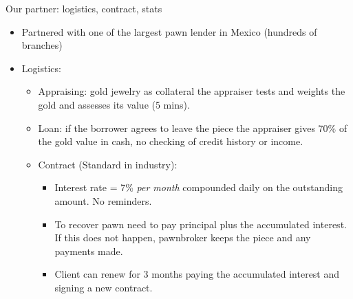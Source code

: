 \documentclass[8pt]{beamer}
\begin{document}
\begin{frame}{Our partner: logistics, contract, stats}
    \begin{itemize}
        \item Partnered with one of the largest pawn lender in Mexico (hundreds of branches)
        \vfill\item Logistics: 
        \begin{itemize}
            \vfill\item Appraising:  gold jewelry as collateral the appraiser tests and weights the gold and assesses its value (5 mins).
           \vfill \item Loan: if the borrower agrees to leave the piece the appraiser gives 70\% of the gold value in cash, no checking of credit history or income.
           \vfill \item Contract (Standard in industry): 
           \begin{itemize}
               \vfill\item Interest rate = 7\% \textit{per month} compounded daily on the outstanding amount. No reminders.
               \vfill\item To recover pawn need to pay principal plus the accumulated interest. If this does not happen, pawnbroker keeps the piece and any payments made.
               \vfill\item  Client can renew for 3 months paying the accumulated interest and signing a new contract.
           \end{itemize}
        \end{itemize}

    \end{itemize}
\end{frame}
\end{document}
